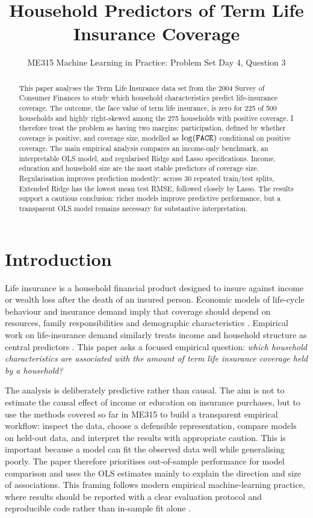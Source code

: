 \documentclass[10pt,a4paper]{article}
\title{\vspace{-1.5em}\textbf{Household Predictors of Term Life Insurance Coverage}}
\author{ME315 Machine Learning in Practice: Problem Set Day 4, Question 3}
\date{}
\newcommand{\mtt}[1]{\text{\texttt{#1}}}
\begin{document}
\maketitle
\vspace{-2.0em}

\begin{abstract}
\noindent This paper analyses the Term Life Insurance data set from the 2004 Survey of Consumer Finances to study which household characteristics predict life-insurance coverage. The outcome, the face value of term life insurance, is zero for 225 of 500 households and highly right-skewed among the 275 households with positive coverage. I therefore treat the problem as having two margins: participation, defined by whether coverage is positive, and coverage size, modelled as $\log(\mtt{FACE})$ conditional on positive coverage. The main empirical analysis compares an income-only benchmark, an interpretable OLS model, and regularised Ridge and Lasso specifications. Income, education and household size are the most stable predictors of coverage size. Regularisation improves prediction modestly: across 30 repeated train/test splits, Extended Ridge has the lowest mean test RMSE, followed closely by Lasso. The results support a cautious conclusion: richer models improve predictive performance, but a transparent OLS model remains necessary for substantive interpretation.
\end{abstract}

\section{Introduction}

Life insurance is a household financial product designed to insure against income or wealth loss after the death of an insured person. Economic models of life-cycle behaviour and insurance demand imply that coverage should depend on resources, family responsibilities and demographic characteristics \citep{yaari1965,lewis1989}. Empirical work on life-insurance demand similarly treats income and household structure as central predictors \citep{brownekim1993}. This paper asks a focused empirical question: \emph{which household characteristics are associated with the amount of term life insurance coverage held by a household?}

The analysis is deliberately predictive rather than causal. The aim is not to estimate the causal effect of income or education on insurance purchases, but to use the methods covered so far in ME315 to build a transparent empirical workflow: inspect the data, choose a defensible representation, compare models on held-out data, and interpret the results with appropriate caution. This is important because a model can fit the observed data well while generalising poorly. The paper therefore prioritises out-of-sample performance for model comparison and uses the OLS estimates mainly to explain the direction and size of associations. This framing follows modern empirical machine-learning practice, where results should be reported with a clear evaluation protocol and reproducible code rather than in-sample fit alone \citep{pineau2020}.
\end{document}
